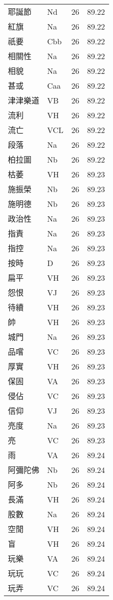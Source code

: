 \documentclass[twocolumn]{book}
\begin{document}
\begin{supertabular}{llrr}
耶誕節 & Nd & 26 &  89.22\\
紅旗 & Na & 26 &  89.22\\
祇要 & Cbb & 26 &  89.22\\
相關性 & Na & 26 &  89.22\\
相貌 & Na & 26 &  89.22\\
甚或 & Caa & 26 &  89.22\\
津津樂道 & VB & 26 &  89.22\\
流利 & VH & 26 &  89.22\\
流亡 & VCL & 26 &  89.22\\
段落 & Na & 26 &  89.22\\
柏拉圖 & Nb & 26 &  89.22\\
枯萎 & VH & 26 &  89.23\\
施振榮 & Nb & 26 &  89.23\\
施明德 & Nb & 26 &  89.23\\
政治性 & Na & 26 &  89.23\\
指責 & Na & 26 &  89.23\\
指控 & Na & 26 &  89.23\\
按時 & D & 26 &  89.23\\
扁平 & VH & 26 &  89.23\\
怨恨 & VJ & 26 &  89.23\\
待續 & VH & 26 &  89.23\\
帥 & VH & 26 &  89.23\\
城門 & Na & 26 &  89.23\\
品嚐 & VC & 26 &  89.23\\
厚實 & VH & 26 &  89.23\\
保固 & VA & 26 &  89.23\\
侵佔 & VC & 26 &  89.23\\
信仰 & VJ & 26 &  89.23\\
亮度 & Na & 26 &  89.23\\
亮 & VC & 26 &  89.23\\
雨 & VA & 26 &  89.24\\
阿彌陀佛 & Nb & 26 &  89.24\\
阿多 & Nb & 26 &  89.24\\
長滿 & VH & 26 &  89.24\\
股數 & Na & 26 &  89.24\\
空閒 & VH & 26 &  89.24\\
盲 & VH & 26 &  89.24\\
玩樂 & VA & 26 &  89.24\\
玩玩 & VC & 26 &  89.24\\
玩弄 & VC & 26 &  89.24\\

\end{supertabular}
\end{document}
